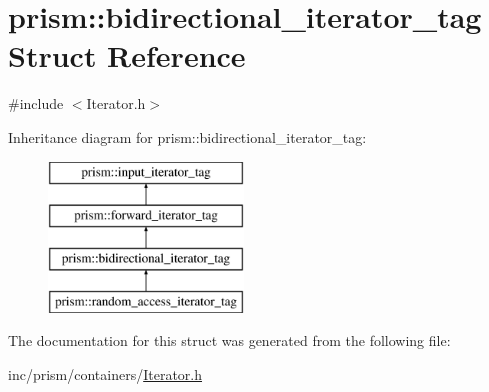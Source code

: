 \hypertarget{structprism_1_1bidirectional__iterator__tag}{}\section{prism\+:\+:bidirectional\+\_\+iterator\+\_\+tag Struct Reference}
\label{structprism_1_1bidirectional__iterator__tag}


{\ttfamily \#include $<$Iterator.\+h$>$}

Inheritance diagram for prism\+:\+:bidirectional\+\_\+iterator\+\_\+tag\+:\begin{figure}[H]
\begin{center}
\leavevmode
\includegraphics[height=4.000000cm]{structprism_1_1bidirectional__iterator__tag}
\end{center}
\end{figure}


The documentation for this struct was generated from the following file\+:\begin{DoxyCompactItemize}
\item 
inc/prism/containers/\hyperlink{_iterator_8h}{Iterator.\+h}\end{DoxyCompactItemize}
